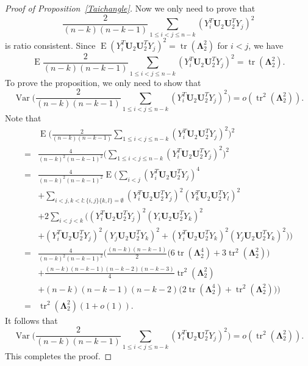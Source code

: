 \documentclass[12pt]{article} %
\DeclareMathOperator{\mytr}{tr}
\DeclareMathOperator{\myE}{E}
\DeclareMathOperator{\myVar}{Var}
\newcommand{\bU}{\mathbf{U}}
\newcommand{\bfsym}[1]{\ensuremath{\boldsymbol{#1}}}
\def\bLambda {\bfsym {\Lambda}}
\theoremstyle{definition}
\begin{document}
\begin{proof}[Proof of Proposition~\ref{Taichangle}]
        Now we only need to prove that
        $$
    \frac{2}{(n-k)(n-k-1)}\sum_{1\leq i<j\leq n-k}(Y_i^T \bU_2 \bU_2^T Y_j)^2 
        $$
        is ratio consistent.
        Since $\myE (Y_i^T \bU_2 \bU_2^T Y_j)^2=\mytr(\bLambda_2^2)$ for $i< j$, we have
    $$
        \myE
    \frac{2}{(n-k)(n-k-1)}\sum_{1\leq i<j\leq n-k}(Y_i^T \bU_2 \bU_2^T Y_j)^2 
        =\mytr(\bLambda_2^2).
        $$
        To prove the proposition, we only need to show that 
        $$
        \myVar
    \Big(
    \frac{2}{(n-k)(n-k-1)}\sum_{1\leq i<j\leq n-k}(Y_i^T \bU_2 \bU_2^T Y_j)^2 
    \Big)
        =o(\mytr^2(\bLambda_2^2)).
        $$
         Note that
         $$
        \begin{aligned}
            &\myE\Big(
    \frac{2}{(n-k)(n-k-1)}\sum_{1\leq i<j\leq n-k}(Y_i^T \bU_2 \bU_2^T Y_j)^2 
            \Big)^2\\
            =&
            \frac{4}{(n-k)^2(n-k-1)^2}\Big(\sum_{1\leq i < j\leq n-k}(Y_i^T \bU_2 \bU_2^T Y_j)^2\Big)^2\\
            =&
            \frac{4}{(n-k)^2(n-k-1)^2}\myE\Big( \sum_{i<j}(Y_i^T\bU_2 \bU_2^T Y_j)^4\\
            &+
            \sum_{i<j,k<l:\{i,j\}\{k,l\}=\emptyset}(Y_i^T\bU_2 \bU_2^T Y_j)^2 (Y_k^T\bU_2 \bU_2^T Y_l)^2\\
            &+2\sum_{i<j<k}\big((Y_i^T\bU_2 \bU_2^T Y_j)^2(Y_i\bU_2 \bU_2^T Y_k)^2\\
            &+(Y_i^T\bU_2 \bU_2^T Y_j)^2(Y_j\bU_2 \bU_2^T Y_k)^2+(Y_i^T\bU_2 \bU_2^T Y_k)^2(Y_j\bU_2 \bU_2^T Y_k)^2\big) \Big)\\
            =&
    \frac{4}{(n-k)^2(n-k-1)^2}\Big(
            \frac{(n-k)(n-k-1)}{2}\big(6\mytr(\bLambda_2^4)+3\mytr^2(\bLambda_2^2)\big)\\
            &+\frac{(n-k)(n-k-1)(n-k-2)(n-k-3)}{4}\mytr^2(\bLambda_2^2)\\
            &+(n-k)(n-k-1)(n-k-2)\big(2\mytr(\bLambda_2^4)
            +\mytr^2(\bLambda_2^2)\big)
            \Big)\\
            =&
            \mytr^2(\bLambda_2^2)(1+o(1)).
        \end{aligned}
         $$
        It follows that
        $$
        \myVar
    \Big(\frac{2}{(n-k)(n-k-1)}\sum_{1\leq i<j\leq n-k}(Y_i^T \bU_2 \bU_2^T Y_j)^2 
    \Big)
            =
            o(\mytr^2(\bLambda_2^2)).
        $$
        This completes the proof.
\end{proof}
\vskip 14pt
\end{document}
